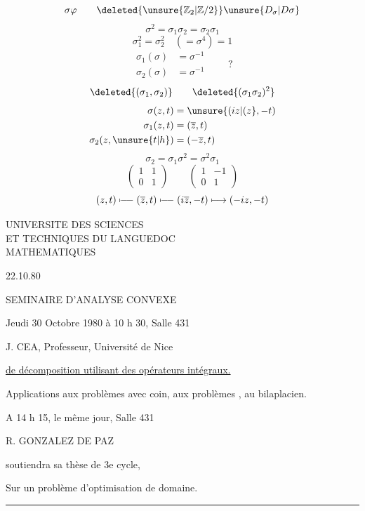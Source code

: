 \[
\sigma\varphi
\qquad \deleted{\unsure{\mathbb Z_2|\mathbb Z/2}}\unsure{D_\sigma|D\sigma}
\]
\[
\boxed{\sigma^2=\sigma_1\sigma_2=\boxed{\sigma_2\sigma_1}}
\]
\[
\sigma_1^2=\sigma_2^2\quad(=\sigma^4)=1
\]
\[
\begin{aligned}
\sigma_1(\sigma)&=\sigma^{-1}\\
\sigma_2(\sigma)&=\sigma^{-1}
\end{aligned}\qquad ?
\]
\[
\deleted{(\sigma_1,\sigma_2)}\qquad\deleted{(\sigma_1\sigma_2)^2}
\]
\[
\begin{aligned}
\sigma(z,t)&=\unsure{(iz|(z},-t)\\
\sigma_1(z,t)&=(\overline z,t)\\
\sigma_2(z,\unsure{t|h})&=(-\overline z,t)
\end{aligned}
\]
\[
\sigma_2=\sigma_1\sigma^2=\sigma^2\sigma_1
\]
\[
\begin{pmatrix}1&1\\0&1\end{pmatrix}\qquad
\begin{pmatrix}1&-1\\0&1\end{pmatrix}
\]
\[
(z,t)\mathrel{\mapstochar\! -\! -}(\overline z,t)
 \mathrel{\mapstochar\! -\! -}(i\overline z,-t)
 \longmapsto(-iz,-t)
\]



\begin{flushleft}
UNIVERSITE DES SCIENCES\\
ET TECHNIQUES DU LANGUEDOC\\
MATHEMATIQUES
\end{flushleft}
\begin{flushright}22.10.80\end{flushright}

\begin{center}
SEMINAIRE D'ANALYSE CONVEXE

Jeudi 30 Octobre 1980 à 10 h 30, Salle 431

J. CEA, Professeur, Université de Nice
\end{center}

\uline{ de décomposition utilisant des opérateurs intégraux.}

Applications aux problèmes avec coin, aux problèmes , au bilaplacien.

A 14 h 15, le même jour, Salle 431

\begin{center}R. GONZALEZ DE PAZ\end{center}

soutiendra sa thèse de 3e cycle,

\begin{center}
Sur un problème d'optimisation de domaine.

\rule{3cm}{.4pt}
\end{center}


